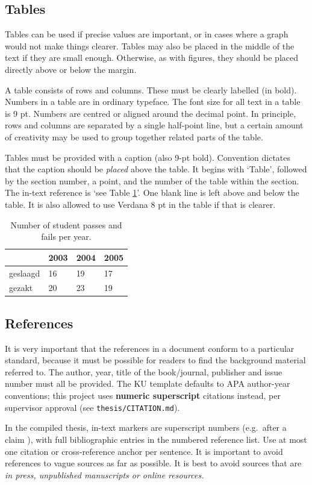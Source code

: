 \subsection{Tables}\label{sec_tables}
Tables can be used if precise values are important, or in cases where a graph would not make things clearer. Tables may also be placed in the middle of the text if they are small enough. Otherwise, as with figures, they should be placed directly above or below the margin.

A table consists of rows and columns. These must be clearly labelled (in bold). Numbers in a table are in ordinary typeface. The font size for all text in a table is 9 pt. Numbers are centred or aligned around the decimal point. In principle, rows and columns are separated by a single half-point line, but a certain amount of creativity may be used to group together related parts of the table.

Tables must be provided with a caption (also 9-pt bold). Convention dictates that the caption should be \textit{placed} above the table. It begins with `Table', followed by the section number, a point, and the number of the table within the section. The in-text reference is `see Table \ref{tab:some_table}'. One blank line is left above and below the table. It is also allowed to use Verdana 8 pt in the table if that is clearer.

\begin{table}[!bp]
\caption{Number of student passes and fails per year.}
\label{tab:some_table}
\begin{tabular}{|l|l|l|l|}
\hline
& 2003 & 2004 & 2005 \\ \hline
geslaagd & 16 & 19 & 17 \\ \hline
gezakt & 20 & 23 & 19 \\ \hline
\end{tabular}
\end{table}

\subsection{References}\label{sec:_references}
It is very important that the references in a document conform to a particular standard, because it must be possible for readers to find the background material referred to. The author, year, title of the book/journal, publisher and issue number must all be provided. The KU template defaults to APA author-year conventions; this project uses \textbf{numeric superscript} citations instead, per supervisor approval (see \texttt{thesis/CITATION.md}).

In the compiled thesis, in-text markers are superscript numbers (e.g.\ after a claim \cite{schwartz97}), with full bibliographic entries in the numbered reference list. Use at most one citation or cross-reference anchor per sentence.
It is important to avoid references to vague sources as far as possible. It is best to avoid sources that are \textit{in press, unpublished manuscripts or online resources.}